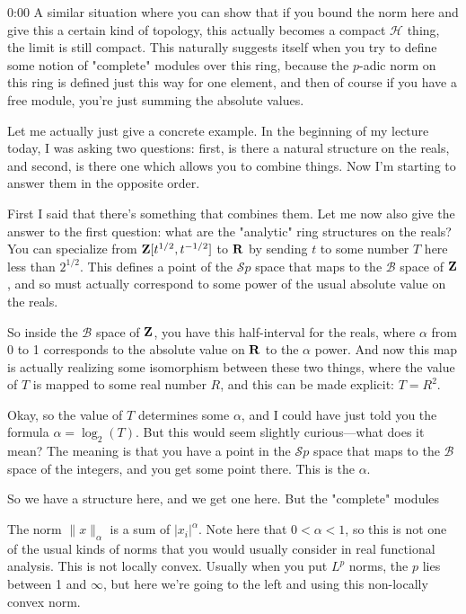\begin{unfinished}{0:00}
A similar situation where you can show that if you bound the norm here and give this a certain kind of topology, this actually becomes a compact $\mathcal{H}$ thing, the limit is still compact. This naturally suggests itself when you try to define some notion of "complete" modules over this ring, because the $p$-adic norm on this ring is defined just this way for one element, and then of course if you have a free module, you're just summing the absolute values.

Let me actually just give a concrete example. In the beginning of my lecture today, I was asking two questions: first, is there a natural structure on the reals, and second, is there one which allows you to combine things. Now I'm starting to answer them in the opposite order. 

First I said that there's something that combines them. Let me now also give the answer to the first question: what are the "analytic" ring structures on the reals? You can specialize from $\mathbf Z[t^{1/2}, t^{-1/2}]$ to $\mathbf R$ by sending $t$ to some number $T$ here less than $2^{1/2}$. This defines a point of the $\mathcal{S}p$ space that maps to the $\mathcal{B}$ space of $\mathbf Z$, and so must actually correspond to some power of the usual absolute value on the reals. 

So inside the $\mathcal{B}$ space of $\mathbf Z$, you have this half-interval for the reals, where $\alpha$ from 0 to 1 corresponds to the absolute value on $\mathbf R$ to the $\alpha$ power. And now this map is actually realizing some isomorphism between these two things, where the value of $T$ is mapped to some real number $R$, and this can be made explicit: $T = R^{2}$.

Okay, so the value of $T$ determines some $\alpha$, and I could have just told you the formula $\alpha = \log_2(T)$. But this would seem slightly curious---what does it mean? The meaning is that you have a point in the $\mathcal{S}p$ space that maps to the $\mathcal{B}$ space of the integers, and you get some point there. This is the $\alpha$. 

So we have a structure here, and we get one here. But the "complete" modules

The norm $\|x\|_\alpha$ is a sum of $|x_i|^\alpha$. Note here that $0 < \alpha < 1$, so this is not one of the usual kinds of norms that you would usually consider in real functional analysis. This is not locally convex. Usually when you put $L^p$ norms, the $p$ lies between 1 and $\infty$, but here we're going to the left and using this non-locally convex norm.


\end{unfinished}
